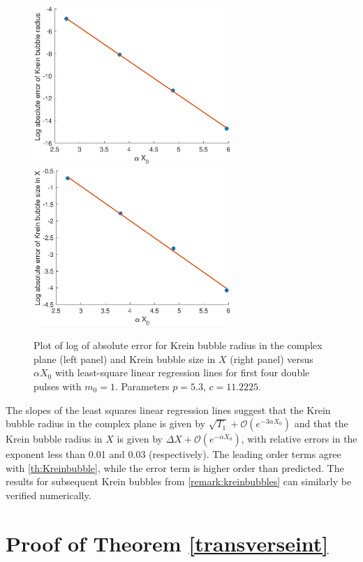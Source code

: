 \documentclass[10pt,reqno]{amsart}
\theoremstyle{plain}
\theoremstyle{definition}
\theoremstyle{remark}
\numberwithin{theorem}{section}
\numberwithin{equation}{section}
\begin{document}
\begin{figure}[H]
\begin{center}
\includegraphics[width=7.5cm]{images/KreinRadiusError.eps}
\includegraphics[width=7.5cm]{images/KreinRadiusXError.eps}
\end{center}
\caption{Plot of log of absolute error for Krein bubble radius in the complex plane (left panel) and Krein bubble size in $X$ (right panel) versus $\alpha X_0$ with least-square linear regression lines for first four double pulses with $m_0 = 1$. Parameters $p = 5.3$, $c = 11.2225$.}
\label{fig:kreinerrors}
\end{figure}
\noi The slopes of the least squares linear regression lines suggest that the Krein bubble radius in the complex plane is given by $\sqrt{T_1} + \mathcal{O}(e^{-3 \alpha X_0})$ and that the Krein bubble radius in $X$ is given by $\Delta X + \mathcal{O}(e^{-\alpha X_0})$, with relative errors in the exponent less than 0.01 and 0.03 (respectively). The leading order terms agree with \cref{th:Kreinbubble}, while the error term is higher order than predicted. The results for subsequent Krein bubbles from \cref{remark:kreinbubbles} can similarly be verified numerically.

\section{Proof of Theorem \ref{transverseint}}\label{sec:transverseintproof}
\end{document}
